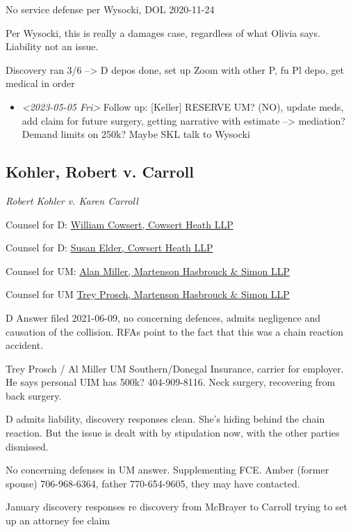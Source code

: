\documentclass[11pt]{article}
\begin{document}
No service defense per Wysocki, DOL 2020-11-24

Per Wysocki, this is really a damages case, regardless of what Olivia says. Liability not an issue.

Discovery ran 3/6 --> D depos done, set up Zoom with other P, fu Pl depo, get medical in order

\begin{itemize}
\item \textit{<2023-05-05 Fri> } Follow up: [Keller] RESERVE UM? (NO), update meds, add claim for future surgery, getting narrative with estimate --> mediation? Demand limits on 250k? Maybe SKL talk to Wysocki
\end{itemize}

\subsection*{Kohler, Robert v. Carroll}
\label{sec:org708775f}

\emph{Robert Kohler v. Karen Carroll}

Counsel for D: \href{https://gabar.reliaguide.com/lawyer/30603-GA-William-Cowsert-257518}{William Cowsert, Cowsert Heath LLP}

Counsel for D: \href{https://gabar.reliaguide.com/lawyer/30603-GA-Susan-Elder-248758}{Susan Elder, Cowsert Heath LLP}

Counsel for UM: \href{http://martensonlaw.com/attorneys/e-alan-miller/}{Alan Miller, Martenson Hasbrouck \& Simon LLP}

Counsel for UM \href{https://gabar.reliaguide.com/lawyer/30326-GA-William-Prosch-309435}{Trey Prosch, Martenson Hasbrouck \& Simon LLP}

D Answer filed 2021-06-09, no concerning defences, admits negligence and causation of the collision. RFAs point to the fact that this was a chain reaction accident.

Trey Prosch / Al Miller UM Southern/Donegal Insurance, carrier for employer. He says personal UIM has 500k? 404-909-8116. Neck surgery, recovering from back surgery.

D admits liability, discovery responses clean. She's hiding behind the chain reaction. But the issue is dealt with by stipulation now, with the other parties dismissed.

No concerning defenses in UM answer. Supplementing FCE. Amber (former spouse) 706-968-6364, father 770-654-9605, they may have contacted.

January discovery responses re discovery from McBrayer to Carroll trying to set up an attorney fee claim
\end{document}
